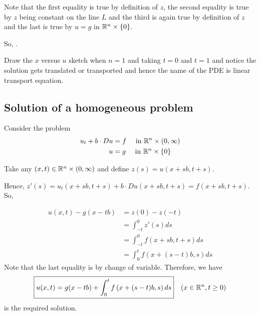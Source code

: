 Note that the first equality is true by definition of $z$, the second equality is true by $z$ being constant on the line $L$ and the third is again true by definition of $z$ and the last is true by $u=g$ in $\mathbb R ^n \times \left\{ 0 \right\}$.

So, .

\begin{remark}
    Draw the $x$ versus $u$ sketch when $n=1$ and taking $t=0$ and $t=1$ and notice the solution gets translated or transported and hence the name of the PDE is linear transport equation.
\end{remark}

\subsection{Solution of a homogeneous problem}
Consider the problem
\begin{align*}
    u_t + b\cdot Du &= f \quad \text{ in } \mathbb R ^n \times (0,\infty ) \\
    u &= g \quad \text{ in } \mathbb R^n \times \left\{ 0 \right\}
\end{align*}
 
Take any $\left( x,t \right) \in \mathbb R ^n \times \left( 0, \infty \right)$ and define $z(s)= u (x+sb, t+s)$.

Hence, $z'(s) = u_t (x+sb, t+s ) + b \cdot Du (x+sb, t+s) = f(x+sb , t+s )$. So,

\begin{align*}
    u(x,t)-g(x-tb) &= z(0) - z(-t) \\
    &= \int_{-t}^{0} z'(s) ds \\
    &= \int_{-t}^{0} f\left( x+sb, t+s \right) ds \\
    &= \int_{0}^{t} f\left( x+(s-t)b, s \right) ds
\end{align*}
Note that the last equality is by change of variable. Therefore, we have 
\begin{equation*}
    \boxed{u(x,t)=g(x-tb)+\int_{0}^{t} f\left( x+(s-t)b, s\right) ds} \quad (x\in \mathbb R ^n , t \ge 0)
\end{equation*}
is the required solution.


